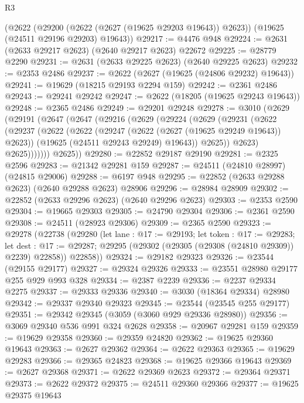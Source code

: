 \begin{lexlean}{R3}
\begin{coremodule}
    (@2622
      (@29200 (@2622 (@2627 (@19625 @29203 @19643)) @2623))
      (@19625 (@24511 @29196 @29203) @19643))
@29217 := @4476 @948
@29224 := @2631 (@2633 @29217 @2623) (@2640 @29217 @2623) @22672
@29225 := @28779 @2290
@29231 := @2631 (@2633 @29225 @2623) (@2640 @29225 @2623)
@29232 := @2353 @2486
@29237 := @2622 (@2627 (@19625 (@24806 @29232) @19643))
@29241 := @19629 (@18215 @29193 @2294 @159)
@29242 := @2361 @2486
@29243 := @29241 @29242
@29247 := @2622 (@18205 (@19625 @29243 @19643))
@29248 := @2365 @2486
@29249 := @29201 @29248
@29278 := @3010
    (@2629
      (@29191
        (@2647
          (@2647
            (@29216
              (@2629
                (@29224
                  (@2629
                    (@29231
                      (@2622
                        (@29237
                          (@2622
                            (@2622
                              (@29247 (@2622 (@2627 (@19625 @29249 @19643)) @2623))
                              (@19625 (@24511 @29243 @29249) @19643))
                            @2625))
                        @2623)
                      @2625)))))))
        @2625))
@29280 := @22852 @29187 @29190
@29281 := @2325 @2596
@29283 := @21342 @29281 @159
@29287 := @24511 (@24810 @28997) (@24815 @29006)
@29288 := @6197 @948
@29295 := @22852 (@2633 @29288 @2623) (@2640 @29288 @2623) @28906
@29296 := @28984 @28909
@29302 := @22852 (@2633 @29296 @2623) (@2640 @29296 @2623)
@29303 := @2353 @2590
@29304 := @19665 @29303
@29305 := @24790 @29304
@29306 := @2361 @2590
@29308 := @24511 (@28923 @29306)
@29309 := @2365 @2590
@29323 := @29278
    (@22738
      (@29280
        (let lane : @17 := @29193;
        let token : @17 := @29283;
        let dest : @17 := @29287; @29295 (@29302 (@29305 (@29308 (@24810 @29309)) @2239) @22858))
        @22858))
@29324 := @29182 @29323
@29326 := @23544 (@29155 @29177)
@29327 := @29324 @29326
@29333 := @23551 @28980 @29177 @255 @929 @993 @328
@29334 := @2387 @2239
@29336 := @2237 @29334 @2275
@29337 := @29333 @29336
@29340 := @3030 (@18364 @29334) @28980
@29342 := @29337 @29340 @29323
@29345 := @23544 (@23545 @255 @29177)
@29351 := @29342 @29345 (@3059 (@3060 @929 @29336 @28980))
@29356 := @3069 @29340 @536 @991 @324 @2628
@29358 := @20967 @29281 @159
@29359 := @19629 @29358
@29360 := @29359 @24820
@29362 := @19625 @29360 @19643
@29363 := @2627 @29362
@29364 := @2622 @29363
@29365 := @19629 @29283
@29366 := @29365 @24823
@29368 := @19625 @29366 @19643
@29369 := @2627 @29368
@29371 := @2622 @29369 @2623
@29372 := @29364 @29371
@29373 := @2622 @29372
@29375 := @24511 @29360 @29366
@29377 := @19625 @29375 @19643

\end{coremodule}
\end{lexlean}
